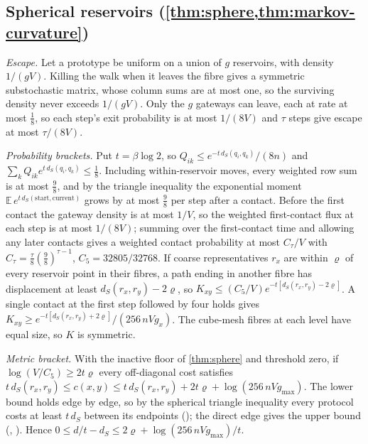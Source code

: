 \subsection{Spherical reservoirs (\texorpdfstring{\cref{thm:sphere,thm:markov-curvature}}{Theorems 6.4 and 7.4})}
\label{app:sphere-proof}

\emph{Escape.}
Let a prototype be uniform on a union of $g$ reservoirs, with density $1/(gV)$.
Killing the walk when it leaves the fibre gives a symmetric substochastic matrix, whose column sums are at most one, so the surviving density never exceeds $1/(gV)$.
Only the $g$ gateways can leave, each at rate at most $\tfrac18$, so each step's exit probability is at most $1/(8V)$ and $\tau$ steps give escape at most $\tau/(8V)$.

\emph{Probability brackets.}
Put $t=\beta\log2$, so $Q_{ik}\le e^{-t\,d_S(q_i,q_k)}/(8n)$ and $\sum_kQ_{ik}e^{t\,d_S(q_i,q_k)}\le\tfrac18$.
Including within-reservoir moves, every weighted row sum is at most $\tfrac98$, and by the triangle inequality the exponential moment $\mathbb E\,e^{t\,d_S(\text{start},\text{current})}$ grows by at most $\tfrac98$ per step after a contact.
Before the first contact the gateway density is at most $1/V$, so the weighted first-contact flux at each step is at most $1/(8V)$; summing over the first-contact time and allowing any later contacts gives a weighted contact probability at most $C_\tau/V$ with $C_\tau=\tfrac\tau8(\tfrac98)^{\tau-1}$, $C_5=32805/32768$.
If coarse representatives $r_x$ are within $\varrho$ of every reservoir point in their fibres, a path ending in another fibre has displacement at least $d_S(r_x,r_y)-2\varrho$, so $K_{xy}\le(C_5/V)e^{-t[d_S(r_x,r_y)-2\varrho]}$.
A single contact at the first step followed by four holds gives $K_{xy}\ge e^{-t[d_S(r_x,r_y)+2\varrho]}/(256\,nVg_x)$.
The cube-mesh fibres at each level have equal size, so $K$ is symmetric.

\emph{Metric bracket.}
With the inactive floor of \cref{thm:sphere} and threshold zero, if $\log(V/C_5)\ge2t\varrho$ every off-diagonal cost satisfies $t\,d_S(r_x,r_y)\le c(x,y)\le t\,d_S(r_x,r_y)+2t\varrho+\log(256\,nVg_{\max})$.
The lower bound holds edge by edge, so by the spherical triangle inequality every protocol costs at least $t\,d_S$ between its endpoints (); the direct edge gives the upper bound (, ).
Hence $0\le d/t-d_S\le2\varrho+\log(256\,nVg_{\max})/t$.

